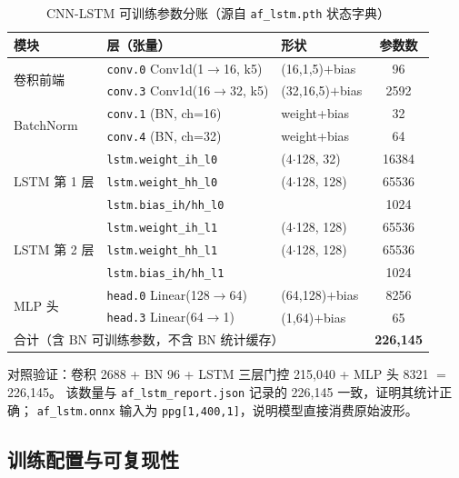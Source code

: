 \documentclass[11pt,a4paper]{ctexart}
\newcommand{\feat}[1]{\texttt{#1}}
\begin{document}
\begin{table}[htbp]
\centering
\small
\caption{CNN-LSTM 可训练参数分账（源自 \feat{af\_lstm.pth} 状态字典）}
\label{tab:cnnlstm}
\begin{tabular}{lllc}
\toprule
模块 & 层（张量） & 形状 & 参数数 \\
\midrule
\multirow{2}{*}{卷积前端} & \feat{conv.0} Conv1d(1$\to$16, k5) & (16,1,5)$+$bias & 96 \\
                     & \feat{conv.3} Conv1d(16$\to$32, k5) & (32,16,5)$+$bias & 2592 \\
\multirow{2}{*}{BatchNorm} & \feat{conv.1} (BN, ch=16) & weight+bias & 32 \\
                     & \feat{conv.4} (BN, ch=32) & weight+bias & 64 \\
\multirow{3}{*}{LSTM 第 1 层} & \feat{lstm.weight\_ih\_l0} & (4$\cdot$128, 32) & 16384 \\
                     & \feat{lstm.weight\_hh\_l0} & (4$\cdot$128, 128) & 65536 \\
                     & \feat{lstm.bias\_ih/hh\_l0} & & 1024 \\
\multirow{3}{*}{LSTM 第 2 层} & \feat{lstm.weight\_ih\_l1} & (4$\cdot$128, 128) & 65536 \\
                     & \feat{lstm.weight\_hh\_l1} & (4$\cdot$128, 128) & 65536 \\
                     & \feat{lstm.bias\_ih/hh\_l1} & & 1024 \\
\multirow{2}{*}{MLP 头} & \feat{head.0} Linear(128$\to$64) & (64,128)$+$bias & 8256 \\
                     & \feat{head.3} Linear(64$\to$1) & (1,64)$+$bias & 65 \\
\midrule
\multicolumn{3}{l}{合计（含 BN 可训练参数，不含 BN 统计缓存）} & \textbf{226{,}145} \\
\bottomrule
\end{tabular}
\end{table}

对照验证：卷积 2688 + BN 96 + LSTM 三层门控 215{,}040 + MLP 头 8321 $=$ 226{,}145。
该数量与 \feat{af\_lstm\_report.json} 记录的 226{,}145 一致，证明其统计正确；
\feat{af\_lstm.onnx} 输入为 \feat{ppg[1,400,1]}，说明模型直接消费原始波形。

\subsection{训练配置与可复现性}
\label{sec:training-config}
\end{document}
